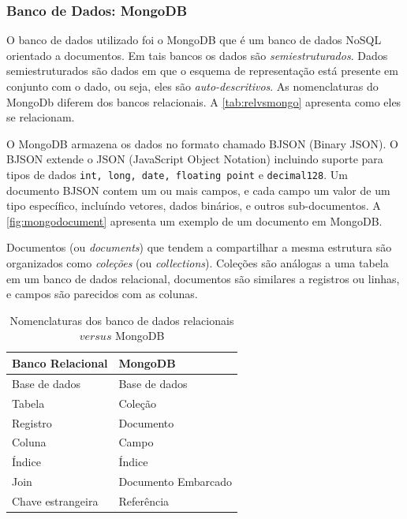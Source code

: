 \subsubsection{Banco de Dados: MongoDB}

O banco de dados utilizado foi o MongoDB que é um banco de dados NoSQL orientado a documentos.
Em tais bancos os dados são \textit{semiestruturados}. Dados semiestruturados
são dados em que o esquema de representação está presente em conjunto com o dado, ou seja,
eles são \textit{auto-descritivos}. As nomenclaturas do MongoDb diferem dos
bancos relacionais. A \autoref{tab:relvsmongo} apresenta como eles se relacionam.

O MongoDB armazena os dados no formato chamado BJSON (Binary JSON). O BJSON extende
o JSON (JavaScript Object Notation) incluindo suporte para tipos de dados
\texttt{int, long, date, floating point} e \texttt{decimal128}. Um documento BJSON contem
um ou mais campos, e cada campo um valor de um tipo específico, incluíndo vetores, dados
binários, e outros sub-documentos. A \autoref{fig:mongodocument} apresenta um
exemplo de um documento em MongoDB.

Documentos (ou \textit{documents}) que tendem a compartilhar a mesma estrutura
são organizados como \textit{coleções} (ou \textit{collections}). Coleções são
análogas a uma tabela em um banco de dados relacional, documentos são similares
a registros ou linhas, e campos são parecidos com as colunas.


\begin{table}[!ht]
  \centering
  \caption{Nomenclaturas dos banco de dados relacionais $versus$ MongoDB}
  \begin{tabular}{l||l}
    \hline
    \textbf{Banco Relacional} & \textbf{MongoDB}\tabularnewline
    \hline
    \hline
    Base de dados & Base de dados\tabularnewline
    Tabela & Coleção\tabularnewline
    Registro & Documento\tabularnewline
    Coluna & Campo\tabularnewline
    Índice & Índice\tabularnewline
    Join & Documento Embarcado\tabularnewline
    Chave estrangeira & Referência\tabularnewline
    \hline
  \end{tabular}
  \doautor
  \label{tab:relvsmongo}
\end{table}

